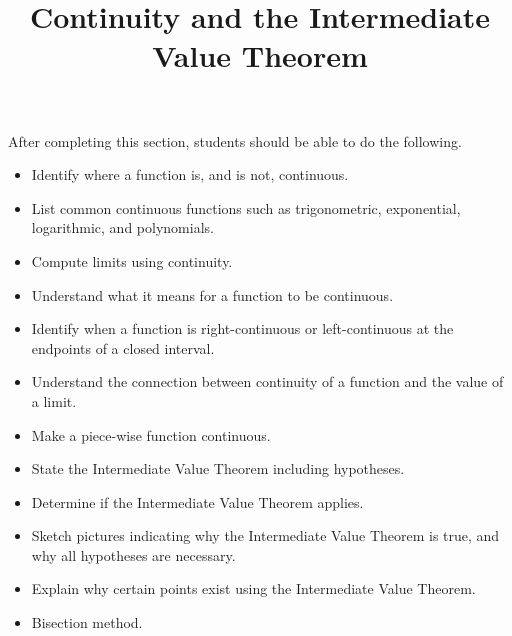 \documentclass{ximera}
\title{Continuity and the Intermediate Value Theorem}
\begin{document}
\begin{abstract}
\end{abstract}

\maketitle

\begin{sectionOutcomes}
After completing this section, students should be able to do the following.

\begin{itemize}
\item Identify where a function is, and is not, continuous.
\item List common continuous functions such as trigonometric, exponential, logarithmic, and polynomials.
\item Compute limits using continuity.
\item Understand what it means for a function to be
  continuous.
\item Identify when a function is right-continuous or left-continuous
  at the endpoints of a closed interval.
\item Understand the connection between continuity of a function and
  the value of a limit.
\item Make a piece-wise function continuous.
\item State the Intermediate Value Theorem including hypotheses.
\item Determine if the Intermediate Value Theorem applies.
\item Sketch pictures indicating why the Intermediate Value Theorem is
  true, and why all hypotheses are necessary.
\item Explain why certain points exist using the Intermediate Value
  Theorem.
\item Bisection method.
\end{itemize}

\end{sectionOutcomes}
\end{document}
